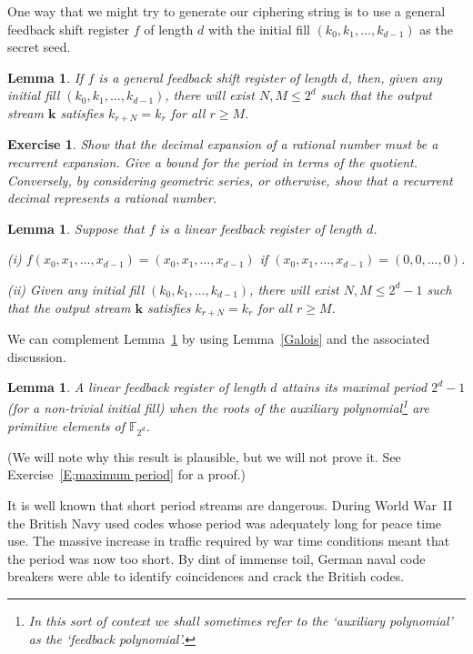 \documentclass[12pt,a4paper]{article}
\theoremstyle{plain}
\newtheorem{lemma}[theorem]{Lemma}
\newtheorem{exercise}[theorem]{Exercise}
\theoremstyle{definition}
\begin{document}
    One way that we might try to generate
    our ciphering string is to use a general
    feedback shift register $f$ of length $d$
    with the initial fill $(k_{0},k_{1},\dots,k_{d-1})$
    as the secret seed.
    \begin{lemma}
        If $f$ is a general
        feedback shift register of length
        $d$, then, given any
        initial fill $(k_{0},k_{1},\dots,k_{d-1})$,
        there will exist $N,M\leq 2^{d}$
        such that the output stream ${\mathbf k}$
        satisfies $k_{r+N}=k_{r}$ for all $r\geq M$.
    \end{lemma}
    \begin{exercise}
        \label{E;rational}
        Show that the decimal expansion of
        a rational number must be a recurrent expansion.
        Give a bound for the period in terms of the quotient.
        Conversely, by considering geometric series, or otherwise,
        show that a recurrent decimal represents
        a rational number.
    \end{exercise}
    \begin{lemma}
        \label{maximum linear}
        Suppose that $f$ is a linear
        feedback register of length $d$.

        (i) $f(x_{0},x_{1},\dots,x_{d-1})=(x_{0},x_{1},\dots,x_{d-1})$
        if $(x_{0},x_{1},\dots,x_{d-1})=(0,0,\dots,0)$.

        (ii) Given any
        initial fill $(k_{0},k_{1},\dots,k_{d-1})$,
        there will exist $N,M\leq 2^{d}-1$
        such that the output stream ${\mathbf k}$
        satisfies $k_{r+N}=k_{r}$ for all $r\geq M$.
    \end{lemma}
    We can complement Lemma~\ref{maximum linear}
    by using Lemma~\ref{Galois} and the associated
    discussion.
    \begin{lemma}
        \label{L;period bound}
        A linear feedback register of length
        $d$ attains its maximal period $2^{d}-1$
        (for a non-trivial initial fill)
        when the roots of the auxiliary polynomial\footnote{In
        this sort of context we shall sometimes refer
        to the `auxiliary polynomial' as the `feedback polynomial'.}
        are primitive elements of ${\mathbb F}_{2^{d}}$.
    \end{lemma}
    \noindent
    (We will note why this result is plausible, but
    we will not prove it. See Exercise~\ref{E;maximum period}
    for a proof.)


    It is well known that short period streams are dangerous.
    During World War~II the British Navy used codes
    whose period was adequately long for peace time use.
    The massive increase in traffic required by
    war time conditions meant that the period was
    now too short. By dint of immense toil, German naval
    code breakers were able to identify coincidences
    and crack the British codes.
\end{document}
